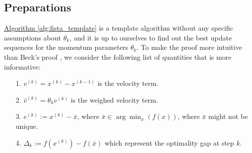 \documentclass[]{article}
\theoremstyle{definition}
\begin{document}
    \subsection{Preparations}
        \hyperref[alg:fista_template]{Algorithm \ref*{alg:fista_template}} is a template algorithm without any specific assumptions about $\theta_k$, and it is up to ourselves to find out the best update sequences for the momentum parameters $\theta_k$. To make the proof more intuitive than Beck's proof \cite{paper:FISTA}, we consider the following list of quantities that is more informative: 
        \begin{itemize}
            \item [1.] $v^{(k)} = x^{(k)} - x^{(k -1)}$ is the velocity term. 
            \item [2.] $\bar v^{(k)}= \theta_k v^{(k)}$ is the weighed velocity term. 
            \item [3.] $e^{(k)} := x^{(k)} - \bar x$, where $\bar x \in \arg\min_{x}(f(x))$, where $\bar x$ might not be unique. 
            \item [4.] $\Delta_k := f(x^{(k)}) - f(\bar x)$ which represent the optimality gap at step $k$. 
        \end{itemize}
\end{document}
